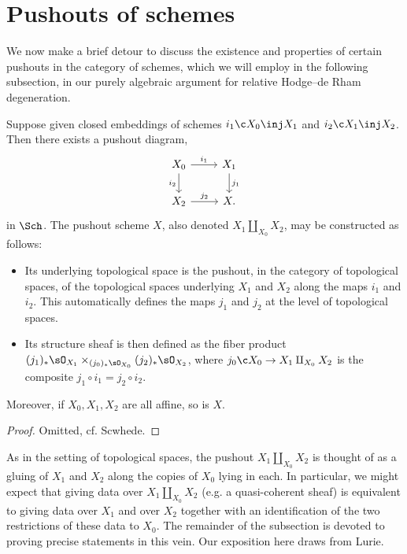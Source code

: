 \section{Pushouts of schemes}
\label{vhs--pushouts}

We now make a brief detour to discuss the existence and properties of certain pushouts in the category of schemes, which we will employ in the following subsection, in our purely algebraic argument for relative Hodge--de Rham degeneration. 

\begin{proposition}
  \label{vhs--pushouts--construction}
  Suppose given closed embeddings of schemes $i_1 \c X_0 \inj X_1$ and $i_2 \c X_1 \inj X_2$. Then there exists a pushout diagram,
  \[
    \begin{tikzcd}
      X_0 \ar[r, "i_1"] \ar[d, "i_2", swap] &
      X_1 \ar[d, "j_1"] \\
      X_2 \ar[r, "j_2"] &
      X.
    \end{tikzcd}
  \]
  in $\Sch$. The pushout scheme $X$, also denoted $X_1 \amalg_{X_0} X_2$, may be constructed as follows:
  \begin{itemize}
  \item Its underlying topological space is the pushout, in the category of topological spaces, of the topological spaces underlying $X_1$ and $X_2$ along the maps $i_1$ and $i_2$. This automatically defines the maps $j_1$ and $j_2$ at the level of topological spaces.
  \item Its structure sheaf is then defined as the fiber product $(j_1)_*\sO_{X_1} \times_{(j_0)_*\sO_{X_0}} (j_2)_*\sO_{X_2}$, where $j_0 \c X_0 \to X_1 \amalg_{X_0} X_2$ is the composite $j_1 \circ i_1 = j_2 \circ i_2$.
  \end{itemize}
  Moreover, if $X_0,X_1,X_2$ are all affine, so is $X$.
\end{proposition}

\begin{proof}
  Omitted, cf. Scwhede.
\end{proof}

As in the setting of topological spaces, the pushout $X_1 \amalg_{X_0} X_2$ is thought of as a gluing of $X_1$ and $X_2$ along the copies of $X_0$ lying in each. In particular, we might expect that giving data over $X_1 \amalg_{X_0} X_2$ (e.g. a quasi-coherent sheaf) is equivalent to giving data over $X_1$ and over $X_2$ together with an identification of the two restrictions of these data to $X_0$. The remainder of the subsection is devoted to proving precise statements in this vein. Our exposition here draws from Lurie.

